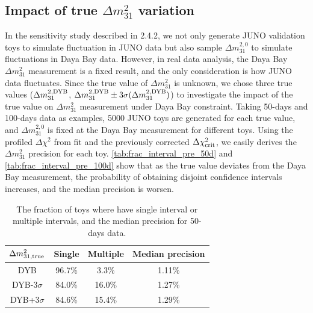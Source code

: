 \subsection{Impact of true $\Delta m^2_{31}$ variation}
In the sensitivity study described in 2.4.2, we not only generate JUNO validation toys to simulate fluctuation in JUNO data but also sample $\Delta m^{2,0}_{31}$ to simulate fluctuations in Daya Bay data. However, in real data analysis, the Daya Bay $\Delta m^2_{31}$ measurement is a fixed result, and the only consideration is how JUNO data fluctuates. Since the true value of $\Delta m^2_{31}$ is unknown, we chose three true values ($\Delta m^{2,\rm{DYB}}_{31}$, $\Delta m^{2,\rm{DYB}}_{31} \pm 3\sigma(\Delta m^{2,\rm{DYB}}_{31})$) to investigate the impact of the true value on $\Delta m^2_{31}$ measurement under Daya Bay constraint. Taking 50-days and 100-days data as examples, 5000 JUNO toys are generated for each true value, and $\Delta m^{2,0}_{31}$ is fixed at the Daya Bay measurement for different toys. Using the profiled $\Delta\chi^2$ from fit and the previously corrected $\Delta\chi^2_{\text{\rm crit}}$, we easily derives the $\Delta m^2_{31}$ precision for each toy. \autoref{tab:frac_interval_pre_50d} and \autoref{tab:frac_interval_pre_100d} show that as the true value deviates from the Daya Bay measurement, the probability of obtaining disjoint confidence intervals increases, and the median precision is worsen.
\begin{table}[!ht]
    \centering
    \begin{tabular}{c|cc|c}
    \toprule
      $\Delta m^2_{31,\rm{true}}$ & Single & Multiple & Median precision \\
    \midrule
      DYB & 96.7\% & 3.3\% & 1.11\% \\
      DYB-3$\sigma$ & 84.0\% & 16.0\% & 1.27\% \\
      DYB+3$\sigma$ & 84.6\% & 15.4\% & 1.29\% \\
    \bottomrule
    \end{tabular}
    \caption{The fraction of toys where have single interval or multiple intervals, and the median precision for 50-days data.}
    \label{tab:frac_interval_pre_50d}
\end{table}

